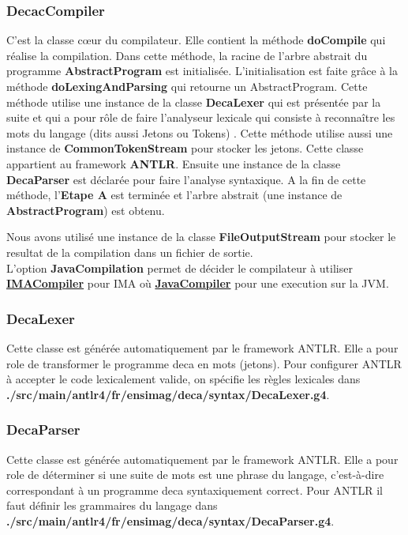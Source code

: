 \documentclass[12pt, a4paper, one side]{article}
\begin{document}
    \subsubsection{DecacCompiler} C'est la classe cœur du compilateur. Elle
    contient la méthode \textbf{doCompile} qui réalise la compilation. Dans
    cette méthode, la racine de l'arbre abstrait du programme
    \textbf{AbstractProgram} est initialisée. L'initialisation est faite grâce à
    la méthode \textbf{doLexingAndParsing} qui retourne un AbstractProgram.
    Cette méthode utilise une instance de la classe \textbf{DecaLexer} qui est
    présentée par la suite et qui a pour rôle de faire l'analyseur lexicale qui
    consiste à reconnaître les mots du langage (dits aussi Jetons ou Tokens) .
    Cette méthode utilise aussi une instance de \textbf{CommonTokenStream} pour
    stocker les
    jetons. Cette classe appartient au framework \textbf{ANTLR}. Ensuite une instance de la
    classe \textbf{DecaParser} est déclarée pour faire l'analyse syntaxique. A la fin de cette
    méthode, l'\textbf{Etape A} est terminée et l'arbre abstrait (une instance de \textbf{AbstractProgram}) est obtenu.

    Nous avons utilisé une instance de la classe \textbf{FileOutputStream} pour stocker le resultat de la compilation dans un fichier de sortie.\\

    L'option \textbf{JavaCompilation} permet de décider le compilateur à utiliser \textbf{\underline{IMACompiler}}
    pour IMA où \textbf{\underline{JavaCompiler}} pour une execution sur la JVM.

    \subsubsection{DecaLexer} Cette classe est générée automatiquement par le framework ANTLR.
    Elle a pour role de transformer le programme deca en mots (jetons).
    Pour configurer ANTLR à accepter le code lexicalement valide, on spécifie les règles lexicales dans \textbf{./src/main/antlr4/fr/ensimag/deca/syntax/DecaLexer.g4}.

    \subsubsection{DecaParser} Cette classe est générée automatiquement par le framework ANTLR.
    Elle a pour role de déterminer si une suite de mots est une phrase du langage,
    c'est-à-dire correspondant à un programme deca syntaxiquement correct.
    Pour ANTLR il faut définir les grammaires du langage dans \textbf{./src/main/antlr4/fr/ensimag/deca/syntax/DecaParser.g4}.
\end{document}
